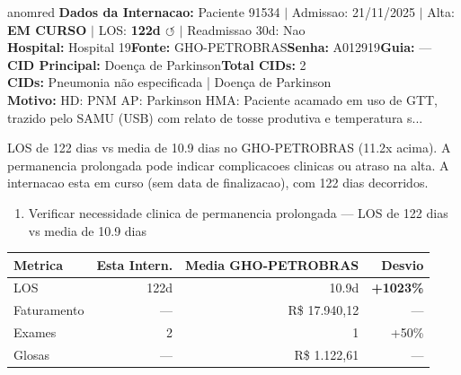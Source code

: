 \documentclass[a4paper,10pt]{article}
\begin{document}
\begin{anomalycard}[Internacao 155949 | GHO-PETROBRAS | CRITICO (z=5.27)]{anomred}
\textbf{Dados da Internacao:} Paciente 91534 $\mid$ Admissao: 21/11/2025 $\mid$ Alta: \textcolor{anomorange}{\textbf{EM CURSO}} $\mid$ LOS: \textbf{122d \textcolor{anomorange}{$\circlearrowleft$}} $\mid$ Readmissao 30d: Nao\\
\textbf{Hospital:} Hospital 19\quad\textbf{Fonte:} GHO-PETROBRAS\quad\textbf{Senha:} A012919\quad\textbf{Guia:} ---\\
\textbf{CID Principal:} {\small Doença de Parkinson}\quad\textbf{Total CIDs:} 2\\

\textbf{CIDs:} {\scriptsize Pneumonia não especificada | Doença de Parkinson}\\

\textbf{Motivo:} {\scriptsize HD: PNM AP: Parkinson HMA: Paciente acamado em uso de GTT, trazido pelo SAMU (USB) com relato de tosse produtiva e temperatura s...}\\

\vspace{2pt}\begin{tcolorbox}[colback=severityred!20,colframe=anomred,title={\textbf{Interpretacao de Negocio}},fonttitle=\bfseries\small,left=4pt,right=4pt,top=3pt,bottom=3pt]
{\small LOS de 122 dias vs media de 10.9 dias no GHO-PETROBRAS (11.2x acima). A permanencia prolongada pode indicar complicacoes clinicas ou atraso na alta. A internacao esta em curso (sem data de finalizacao), com 122 dias decorridos.}
\end{tcolorbox}
\begin{tcolorbox}[colback=severityyellow!30,colframe=anomorange,title={\textbf{Recomendacoes Especificas}},fonttitle=\bfseries\small,left=4pt,right=4pt,top=3pt,bottom=3pt]
\begin{enumerate}[nosep,leftmargin=16pt]
\item {\small Verificar necessidade clinica de permanencia prolongada --- LOS de 122 dias vs media de 10.9 dias}
\end{enumerate}
\end{tcolorbox}
\begin{center}\begin{tabular}{l r r r}\toprule\textbf{Metrica} & \textbf{Esta Intern.} & \textbf{Media GHO-PETROBRAS} & \textbf{Desvio} \\\midrule
LOS & 122d & 10.9d & \textcolor{anomred}{\textbf{+1023\%}} \\
Faturamento & --- & R\$ 17.940,12 & --- \\
Exames & 2 & 1 & \textcolor{anomorange}{+50\%} \\
Glosas & --- & R\$ 1.122,61 & --- \\
\bottomrule\end{tabular}\end{center}


\end{anomalycard}
\end{document}
